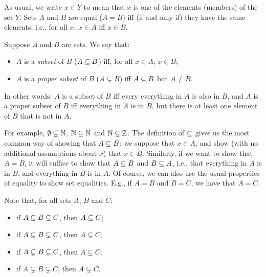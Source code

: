 As usual, we write $x\in Y$
%
%
%
%
to mean that $x$ is one of the elements (members) of the set $Y$.
Sets $A$ and $B$ are equal ($A=B$)
%
%
%
%
iff (if and only if) they have the same elements, i.e., for all $x$,
%
$x\in A$ iff $x\in B$.

Suppose $A$ and $B$ are sets.  We say that:
\begin{itemize}
\item $A$ is a \emph{subset}
%
%
of $B$ ($A\subseteq B$)
%
%
iff, for all $x\in A$, $x\in B$;

\item $A$ is a
\emph{proper subset}
%
%
%
of $B$ ($A\subsetneq B$)
%
%
iff $A\subseteq B$ but $A\neq B$.
\end{itemize}
In other words: $A$ is a subset of $B$ iff every everything in $A$ is
also in $B$, and $A$ is a proper subset of $B$ iff everything in $A$
is in $B$, but there is at least one element of $B$ that is not in
$A$.

For example, $\emptyset\subsetneq\mathbb{N}$, $\mathbb{N}\subseteq\mathbb{N}$ and
$\mathbb{N}\subsetneq\mathbb{Z}$.  The definition of $\subseteq$ gives us the most
common way of showing that $A\subseteq B$: we suppose that $x\in A$, and
show (with no additional assumptions about $x$) that $x\in B$.
Similarly, if we want to show that $A=B$, it will suffice to show that
$A\subseteq B$ and $B\subseteq A$, i.e., that everything in $A$ is in $B$, and
everything in $B$ is in $A$.  Of course, we can also use the
usual properties of equality to show set equalities.  E.g.,
if $A=B$ and $B=C$, we have that $A=C$.

Note that, for all sets $A$, $B$ and $C$:
\begin{itemize}
\item if $A\subseteq B\subseteq C$, then $A\subseteq C$;

\item if $A\subseteq B\subsetneq C$, then $A\subsetneq C$;

\item if $A\subsetneq B\subseteq C$, then $A\subsetneq C$;

\item if $A\subsetneq B\subsetneq C$, then $A\subsetneq C$.
\end{itemize}

